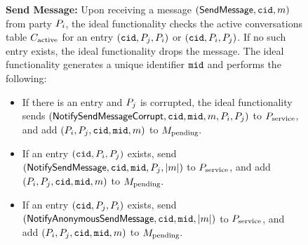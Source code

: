 \begin{figure*}
\begin{tcolorbox}[enhanced,sharp corners,colback=white,boxrule=0.3mm,left=1mm]




		\medskip
		{\bf Send Message:} Upon receiving a message $(\mathsf{SendMessage}, \mathtt{cid}, m)$ from party $P_i$, the ideal functionality checks the active conversations table $C_{\text{active}}$ for an entry $(\mathtt{cid}, P_j, P_i)$ or $(\mathtt{cid}, P_i, P_j)$.  If no such entry exists, the ideal functionality drops the message.  The ideal functionality generates a unique identifier $\mathtt{mid}$ and performs the following:
		\begin{itemize}
			\item If there is an entry and $P_j$ is corrupted, the ideal functionality sends $(\mathsf{NotifySendMessageCorrupt}, \mathtt{cid}, \mathtt{mid}, m, P_i, P_j)$ to $P_{\text{service}}$, and add $(P_i,P_j,\mathtt{cid}, \mathtt{mid}, m)$ to $M_{\text{pending}}.$
			\item If an entry  $(\mathtt{cid}, P_i, P_j)$ exists, send $(\mathsf{NotifySendMessage}, \mathtt{cid}, \mathtt{mid}, P_j, | m |)$ to $P_{\text{service}}$, and add $(P_i,P_j,\mathtt{cid}, \mathtt{mid}, m)$ to $M_{\text{pending}}.$
			\item If an entry $(\mathtt{cid}, P_j, P_i)$ exists, send $(\mathsf{NotifyAnonymousSendMessage}, \mathtt{cid}, \mathtt{mid}, | m |)$ to $P_{\text{service}}$, and add $(P_i,P_j,\mathtt{cid}, \mathtt{mid}, m)$ to $M_{\text{pending}}.$




\end{itemize}
\end{tcolorbox}
\end{figure*}
